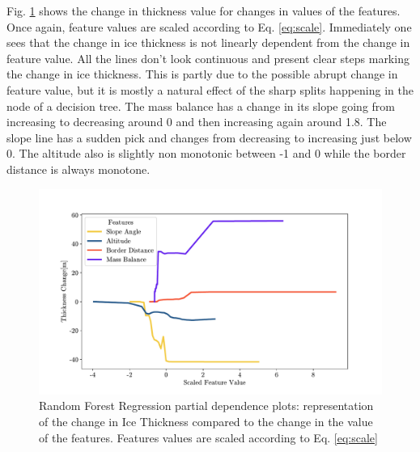 Fig. \ref{fig:rfr-pdp} shows the change in thickness value for changes in values of the features. Once again, feature values are scaled according to Eq. \ref{eq:scale}. Immediately one sees that the change in ice thickness is not linearly dependent from the change in feature value. All the lines don't look continuous and present clear steps marking the change in ice thickness. This is partly due to the possible abrupt change in feature value, but it is mostly a natural effect of the sharp splits happening in the node of a decision tree.  The mass balance has a change in its slope going from increasing to decreasing around 0 and then increasing again around 1.8. The slope line has a sudden pick and changes from decreasing to increasing just below 0. The altitude also is slightly non monotonic between -1 and 0 while the border distance is always monotone. 
\begin{figure}[!tp]
	\centering		  
	\includegraphics[width=1.\textwidth]{figures/RFR_pdp.pdf}
	\caption{Random Forest Regression partial dependence plots: representation of the change in Ice Thickness compared to the change in the value of the features. Features values are scaled according to Eq. \ref{eq:scale}}
	\label{fig:rfr-pdp}
\end{figure}

